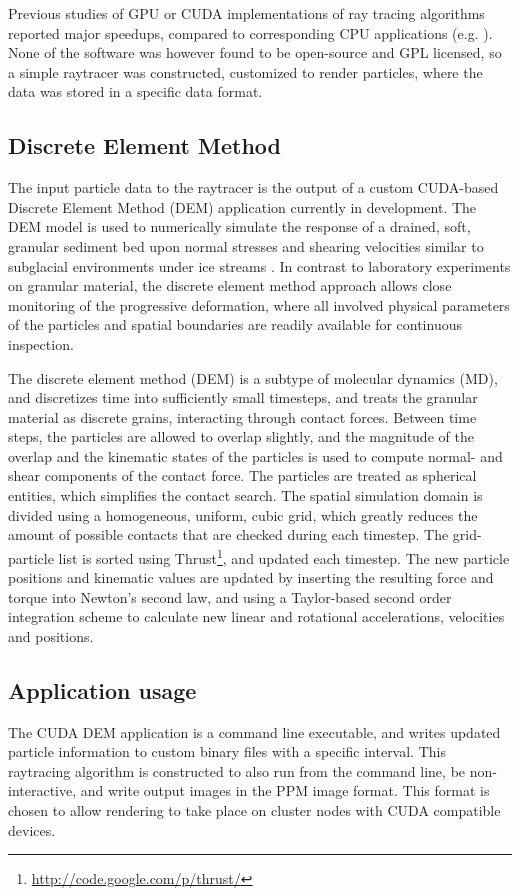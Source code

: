 \documentclass[journal]{IEEEtran}
\begin{document}
Previous studies of GPU or CUDA implementations of ray tracing algorithms reported major speedups, compared to corresponding CPU applications (e.g. \cite{Horn:2007,Shih:2009,Popov:2007,Luebke:2008}). None of the software was however found to be open-source and GPL licensed, so a simple raytracer was constructed, customized to render particles, where the data was stored in a specific data format.

\subsection{Discrete Element Method}
The input particle data to the raytracer is the output of a custom CUDA-based Discrete Element Method (DEM) application currently in development. The DEM model is used to numerically simulate the response of a drained, soft, granular sediment bed upon normal stresses and shearing velocities similar to subglacial environments under ice streams \cite{Evans:2006}. In contrast to laboratory experiments on granular material, the discrete element method \cite{Cundall:1979} approach allows close monitoring of the progressive deformation, where all involved physical parameters of the particles and spatial boundaries are readily available for continuous inspection. 

The discrete element method (DEM) is a subtype of molecular dynamics (MD), and discretizes time into sufficiently small timesteps, and treats the granular material as discrete grains, interacting through contact forces. Between time steps, the particles are allowed to overlap slightly, and the magnitude of the overlap and the kinematic states of the particles is used to compute normal- and shear components of the contact force. The particles are treated as spherical entities, which simplifies the contact search. The spatial simulation domain is divided using a homogeneous, uniform, cubic grid, which greatly reduces the amount of possible contacts that are checked during each timestep. The grid-particle list is sorted using Thrust\footnote{\url{http://code.google.com/p/thrust/}}, and updated each timestep. The new particle positions and kinematic values are updated by inserting the resulting force and torque into Newton's second law, and using a Taylor-based second order integration scheme to calculate new linear and rotational accelerations, velocities and positions.

\subsection{Application usage}
The CUDA DEM application is a command line executable, and writes updated particle information to custom binary files with a specific interval. This raytracing algorithm is constructed to also run from the command line, be non-interactive, and write output images in the PPM image format. This format is chosen to allow rendering to take place on cluster nodes with CUDA compatible devices.
\end{document}
